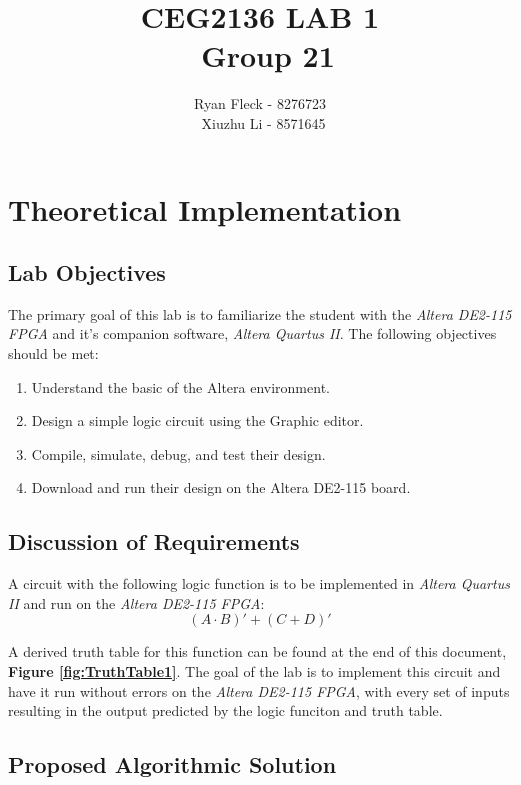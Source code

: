 \documentclass[a4paper,12pt]{article}
\begin{document}
\title{CEG2136 LAB 1 \\\ Group 21}
\author{Ryan Fleck - 8276723 \\\ Xiuzhu Li - 8571645}
\maketitle
\newpage
{}
\tableofcontents
\listoffigures
\newpage
{}


\section{Theoretical Implementation}

\subsection{Lab Objectives}
The primary goal of this lab is to familiarize the student with the \textit{Altera DE2-115 FPGA} and it's companion software, \textit{Altera Quartus II}. The following objectives should be met:
\begin{enumerate}
\item Understand the basic of the Altera environment.
\item Design a simple logic circuit using the Graphic editor.
\item Compile, simulate, debug, and test their design.
\item Download and run their design on the Altera DE2-115 board.
\end{enumerate}

\subsection{Discussion of Requirements}
A circuit with the following logic function is to be implemented in \textit{Altera Quartus II} and run on the \textit{Altera DE2-115 FPGA}:
\begin{equation}
(A \cdot B)' + (C+D)'
\end{equation}

A derived truth table for this function can be found at the end of this document, \textbf{Figure \ref{fig:TruthTable1}}. The goal of the lab is to implement this circuit and have it run without errors on the \textit{Altera DE2-115 FPGA}, with every set of inputs resulting in the output predicted by the logic funciton and truth table.

\subsection{Proposed Algorithmic Solution}
\end{document}

